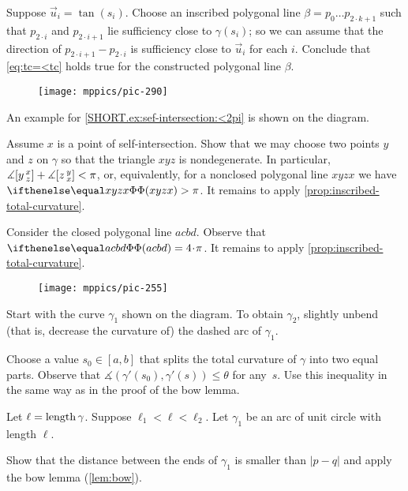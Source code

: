 Suppose $\vec u_i=\tan(s_i)$.
Choose an inscribed polygonal line $\beta=p_0\dots p_{2\cdot k+1}$ such that $p_{2\cdot i}$ and $p_{2\cdot i+1}$ lie sufficiency close to $\gamma(s_i)$; so we can assume that the direction of $p_{2\cdot i+1}-p_{2\cdot i}$ is sufficiency close to $\vec u_i$ for each $i$.
Conclude that \ref{eq:tc=<tc} holds true for the constructed polygonal line $\beta$.

\begin{wrapfigure}{r}{23 mm}
\vskip-6mm
\centering
\texttt{[image: mppics/pic-290]}
\vskip-4mm
\end{wrapfigure}

 An example for \ref{SHORT.ex:sef-intersection:<2pi} is shown on the diagram. 

 Assume $x$ is a point of self-intersection.
Show that we may choose two points $y$ and $z$ on $\gamma$ so that the triangle $xyz$ is nondegenerate.
In particular, 
$\measuredangle[y\,{}^{x}_{z}]
+
\measuredangle[z\,{}^{y}_{x}]
<\pi$, or, equivalently, for a nonclosed polygonal line $xyzx$ we have $\tc{xyzx}>\pi$.
It remains to apply \ref{prop:inscribed-total-curvature}.

Consider the closed polygonal line $acbd$.
Observe that $\tc{acbd}=4\cdot\pi$.
It remains to apply \ref{prop:inscribed-total-curvature}.

{

\begin{wrapfigure}{r}{22 mm}
\vskip-4mm
\centering
\texttt{[image: mppics/pic-255]}
\vskip0mm
\end{wrapfigure}

Start with the curve $\gamma_1$ shown on the diagram.
To obtain $\gamma_2$, slightly unbend (that is, decrease the curvature of) the dashed arc of $\gamma_1$.


Choose a value $s_0\in[a,b]$ that splits the total curvature of $\gamma$ into two equal parts.
Observe that $\measuredangle(\gamma'(s_0),\gamma'(s))\le \theta$ for any~$s$.
Use this inequality in the same way as in the proof of the bow lemma.

}

Let $\ell=\mathop{\rm length}\nolimits\gamma$.
Suppose $\ell_1<\ell<\ell_2$.
Let $\gamma_1$ be an arc of unit circle with length $\ell$.

Show that the distance between the ends of $\gamma_1$ is smaller than $|p-q|$ and apply the bow lemma (\ref{lem:bow}).


